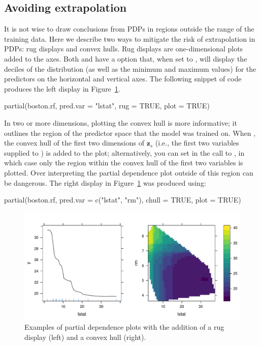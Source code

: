 \subsection{Avoiding extrapolation}

It is not wise to draw conclusions from PDPs in regions outside the range of the training data. Here we describe two ways to mitigate the risk of extrapolation in PDPs: rug displays and convex hulls. Rug displays are one-dimensional plots added to the axes. Both  and  have a  option that, when set to , will display the deciles of the distribution (as well as the minimum and maximum values) for the predictors on the horizontal and vertical axes. The following snippet of code produces the left display in Figure~\ref{fig:partial_extrap}.
\begin{example}
partial(boston.rf, pred.var = "lstat", rug = TRUE, plot = TRUE)
\end{example}

In two or more dimensions, plotting the convex hull is more informative; it outlines the region of the predictor space that the model was trained on. When , the convex hull of the first two dimensions of $\boldsymbol{z}_s$ (i.e., the first two variables supplied to ) is added to the plot; alternatively, you can set  in the call to , in which case only the region within the convex hull of the first two variables is plotted. Over interpreting the partial dependence plot outside of this region can be dangerous. The right display in Figure~\ref{fig:partial_extrap} was produced using:
\begin{example}
partial(boston.rf, pred.var = c("lstat", "rm"), chull = TRUE, plot = TRUE)
\end{example}

\begin{figure}[htbp]
  \centering
  \includegraphics[width=1.0\linewidth]{partial_extrap}
  \caption{Examples of partial dependence plots with the addition of a rug display (left) and a convex hull (right).}
  \label{fig:partial_extrap}
\end{figure}


